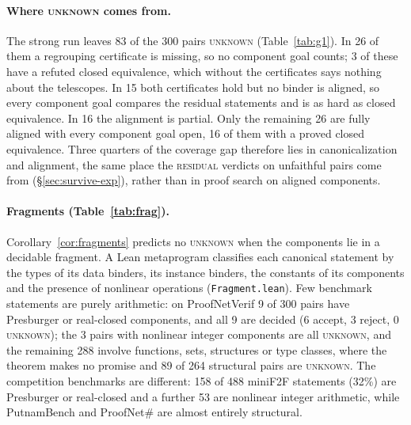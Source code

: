 \documentclass[10pt]{article}
\theoremstyle{definition}
\newcommand{\V}[1]{\textsc{#1}}
\begin{document}
\paragraph{Where \V{unknown} comes from.}\label{app:unk} The strong run leaves 83 of the 300
pairs \V{unknown} (Table~\ref{tab:g1}). In 26 of them a regrouping certificate is missing, so no
component goal counts; 3 of these have a refuted closed equivalence, which without the
certificates says nothing about the telescopes. In 15 both certificates hold but no binder is
aligned, so every component goal compares the residual statements and is as hard as closed
equivalence. In 16 the alignment is partial. Only the remaining 26 are fully
aligned with every component goal open, 16 of them with a proved closed equivalence. Three
quarters of the coverage gap therefore lies in canonicalization and alignment, the same place
the \V{residual} verdicts on unfaithful pairs come from (\S\ref{sec:survive-exp}), rather than in proof search on
aligned components.

\paragraph{Fragments (Table~\ref{tab:frag}).} Corollary~\ref{cor:fragments} predicts no
\V{unknown} when the components lie in a decidable fragment. A Lean metaprogram classifies each
canonical statement by the types of its data binders, its instance binders, the constants of
its components and the presence of nonlinear operations
(\texttt{Fragment.lean}). Few benchmark statements are purely arithmetic:
on ProofNetVerif 9 of 300 pairs have Presburger or real-closed components, and all 9 are
decided (6 accept, 3 reject, 0 \V{unknown}); the 3 pairs with nonlinear integer components are
all \V{unknown}, and the remaining 288 involve functions, sets, structures or type classes,
where the theorem makes no promise and 89 of 264 structural pairs are \V{unknown}. The
competition benchmarks are different: 158 of 488 miniF2F statements (32\%) are Presburger or
real-closed and a further 53 are nonlinear integer arithmetic, while PutnamBench and
ProofNet\# are almost entirely structural.
\end{document}
